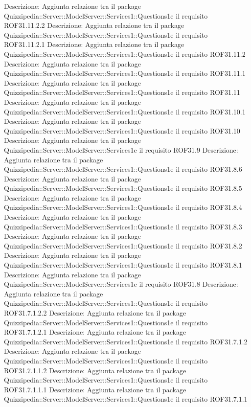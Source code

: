 Descrizione: Aggiunta relazione tra il package Quizzipedia::Server::ModelServer::Services1::Questions1e il requisito ROF31.11.2.2 
Descrizione: Aggiunta relazione tra il package Quizzipedia::Server::ModelServer::Services1::Questions1e il requisito ROF31.11.2.1 
Descrizione: Aggiunta relazione tra il package Quizzipedia::Server::ModelServer::Services1::Questions1e il requisito ROF31.11.2 
Descrizione: Aggiunta relazione tra il package Quizzipedia::Server::ModelServer::Services1::Questions1e il requisito ROF31.11.1 
Descrizione: Aggiunta relazione tra il package Quizzipedia::Server::ModelServer::Services1::Questions1e il requisito ROF31.11 
Descrizione: Aggiunta relazione tra il package Quizzipedia::Server::ModelServer::Services1::Questions1e il requisito ROF31.10.1 
Descrizione: Aggiunta relazione tra il package Quizzipedia::Server::ModelServer::Services1::Questions1e il requisito ROF31.10 
Descrizione: Aggiunta relazione tra il package Quizzipedia::Server::ModelServer::Services1e il requisito ROF31.9 
Descrizione: Aggiunta relazione tra il package Quizzipedia::Server::ModelServer::Services1::Questions1e il requisito ROF31.8.6 
Descrizione: Aggiunta relazione tra il package Quizzipedia::Server::ModelServer::Services1::Questions1e il requisito ROF31.8.5 
Descrizione: Aggiunta relazione tra il package Quizzipedia::Server::ModelServer::Services1::Questions1e il requisito ROF31.8.4 
Descrizione: Aggiunta relazione tra il package Quizzipedia::Server::ModelServer::Services1::Questions1e il requisito ROF31.8.3 
Descrizione: Aggiunta relazione tra il package Quizzipedia::Server::ModelServer::Services1::Questions1e il requisito ROF31.8.2 
Descrizione: Aggiunta relazione tra il package Quizzipedia::Server::ModelServer::Services1::Questions1e il requisito ROF31.8.1 
Descrizione: Aggiunta relazione tra il package Quizzipedia::Server::ModelServer::Services1e il requisito ROF31.8 
Descrizione: Aggiunta relazione tra il package Quizzipedia::Server::ModelServer::Services1::Questions1e il requisito ROF31.7.1.2.2 
Descrizione: Aggiunta relazione tra il package Quizzipedia::Server::ModelServer::Services1::Questions1e il requisito ROF31.7.1.2.1 
Descrizione: Aggiunta relazione tra il package Quizzipedia::Server::ModelServer::Services1::Questions1e il requisito ROF31.7.1.2 
Descrizione: Aggiunta relazione tra il package Quizzipedia::Server::ModelServer::Services1::Questions1e il requisito ROF31.7.1.1.2 
Descrizione: Aggiunta relazione tra il package Quizzipedia::Server::ModelServer::Services1::Questions1e il requisito ROF31.7.1.1.1 
Descrizione: Aggiunta relazione tra il package Quizzipedia::Server::ModelServer::Services1::Questions1e il requisito ROF31.7.1.1 
